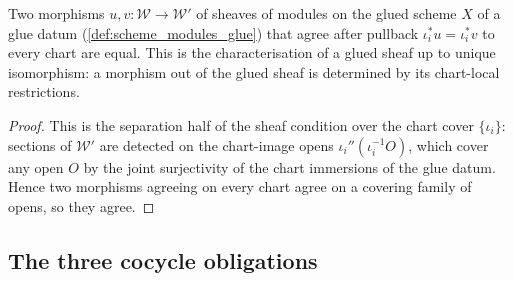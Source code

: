 \begin{lemma}
  \label{lem:gr_modules_glue_unique}
  Two morphisms \(u, v : \mathcal{W} \to \mathcal{W}'\) of sheaves of modules on the glued
  scheme \(X\) of a glue datum (\cref{def:scheme_modules_glue}) that agree after pullback
  \(\iota_i^{*}u = \iota_i^{*}v\) to every chart are equal. This is the characterisation of a
  glued sheaf up to unique isomorphism: a morphism out of the glued sheaf is determined by its
  chart-local restrictions.
\end{lemma}
\begin{proof}
  \leanok
  This is the separation half of the sheaf condition over the chart cover \(\{\iota_i\}\):
  sections of \(\mathcal{W}'\) are detected on the chart-image opens \(\iota_i''(\iota_i^{-1}O)\),
  which cover any open \(O\) by the joint surjectivity of the chart immersions of the glue
  datum. Hence two morphisms agreeing on every chart agree on a covering family of opens, so
  they agree.
\end{proof}

\subsection{The three cocycle obligations}

